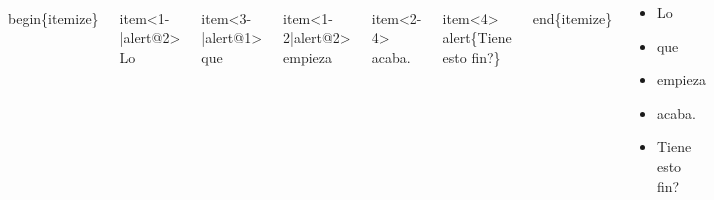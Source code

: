 \documentclass[11pt]{beamer}
\begin{document}
\begin{frame}

\begin{block}{}

\begin{columns}
\begin{semiverbatim}\scriptsize
\\begin\{itemize\}
\end{semiverbatim}

\begin{semiverbatim}\scriptsize
 \\item<1-|alert@2> Lo
\end{semiverbatim}

\begin{semiverbatim}\scriptsize
 \\item<3-|alert@1> que
\end{semiverbatim}

\begin{semiverbatim}\scriptsize
 \\item<1-2|alert@2> empieza
\end{semiverbatim}

\begin{semiverbatim}\scriptsize
 \\item<2-4> acaba.
\end{semiverbatim}

\begin{semiverbatim}\scriptsize
 \\item<4> \\alert\{Tiene esto fin?\}
\end{semiverbatim}

\begin{semiverbatim}\scriptsize
\\end\{itemize\}
\end{semiverbatim}



\begin{itemize}
\item<1-|alert@2> Lo   \item<3-|alert@1> que
\item<1-2|alert@2> empieza
\item<2-4> acaba. \item<4>\alert{Tiene esto fin?}
\end{itemize}


\end{columns}
\end{block}






\end{frame}
\end{document}
